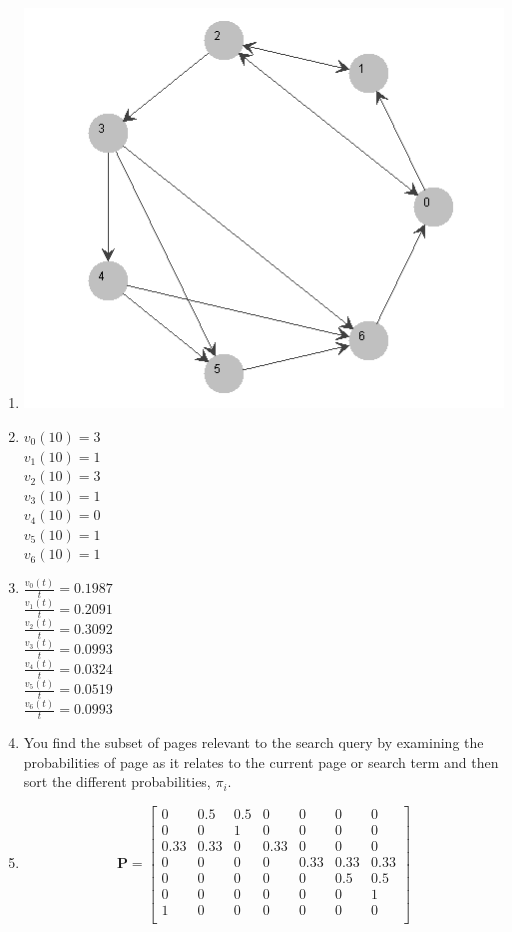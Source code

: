 \documentclass{article}
\begin{document}
\begin{enumerate}
\item \includegraphics[scale=.5]{exercise11}

\item 
	$v_0(10) = 3 $\\
	$v_1(10) = 1 $\\
	$v_2(10) = 3 $\\
	$v_3(10) = 1 $\\
	$v_4(10) = 0 $\\
	$v_5(10) = 1 $\\
	$v_6(10) = 1 $

\item 
	$\frac{v_0(t)}{t} = 0.1987$\\
	$\frac{v_1(t)}{t} = 0.2091$\\
	$\frac{v_2(t)}{t} = 0.3092$\\
	$\frac{v_3(t)}{t} = 0.0993$\\
	$\frac{v_4(t)}{t} = 0.0324$\\
	$\frac{v_5(t)}{t} = 0.0519$\\
	$\frac{v_6(t)}{t} = 0.0993$
	
\item You find the subset of pages relevant to the search query by examining the probabilities of page as it relates to the current page or search term and then sort the different probabilities, $\pi_i$.

\item 
	$$\textbf{P} = \begin{bmatrix} 
	0 & 0.5 & 0.5 & 0 & 0 & 0 & 0 \\ 
	0 & 0 & 1 & 0 & 0 & 0 & 0 \\
	0.33 & 0.33 & 0 & 0.33 & 0 & 0 & 0 \\
	0 & 0 & 0 & 0 & 0.33 & 0.33 & 0.33 \\
	0 & 0 & 0 & 0 & 0 & 0.5 & 0.5 \\
	0 & 0 & 0 & 0 & 0 & 0 & 1 \\
	1 & 0 & 0 & 0 & 0 & 0 & 0 \\ 
	\end{bmatrix}$$
	

\end{enumerate}
\end{document}
